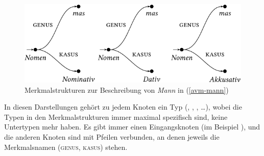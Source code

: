 \begin{figure}
\centerline{%
\includegraphics{Figures/mann-model-theoretic-crop}
}
\caption{\label{abb-avm-mann}Merkmalstrukturen zur Beschreibung von \emph{Mann} in  (\ref{avm-mann})}
\end{figure}
In diesen Darstellungen gehört zu jedem Knoten ein Typ (, , ,
\ldots), wobei die Typen in den Merkmalstrukturen immer maximal spezifisch sind, \dash keine
Untertypen mehr haben. Es gibt immer einen Eingangsknoten (im Beispiel ), und die anderen
Knoten sind mit Pfeilen verbunden, an denen jeweils die Merkmalsnamen (\textsc{genus}, \textsc{kasus}) stehen.

